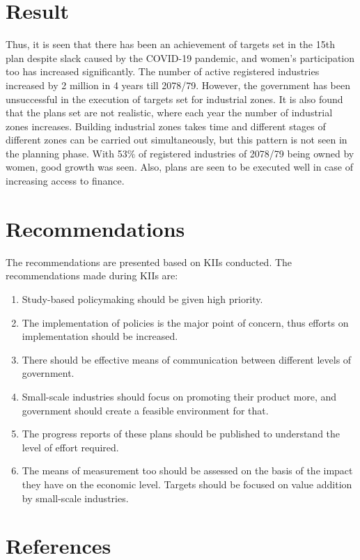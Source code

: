 \documentclass[a4paper]{article}
\begin{document}
\section{Result}
Thus, it is seen that there has been an achievement of targets set in the 15th plan despite slack caused by the COVID-19 pandemic, and women’s participation too has increased significantly. The number of active registered industries increased by 2 million in 4 years till 2078/79. However, the government has been unsuccessful in the execution of targets set for industrial zones. It is also found that the plans set are not realistic, where each year the number of industrial zones increases. Building industrial zones takes time and different stages of different zones can be carried out simultaneously, but this pattern is not seen in the planning phase. With 53\% of registered industries of 2078/79 being owned by women, good growth was seen. Also, plans are seen to be executed well in case of increasing access to finance. 
\section{Recommendations}
The recommendations are presented based on KIIs conducted. The recommendations made during KIIs are:
\begin{enumerate}
\setlength{\labelwidth}{3em}
\setlength{\itemsep}{0pt}
  \item Study-based policymaking should be given high priority.
  \item The implementation of policies is the major point of concern, thus efforts on implementation should be increased.
  \item There should be effective means of communication between different levels of government.
  \item Small-scale industries should focus on promoting their product more, and government should create a feasible environment for that.
  \item The progress reports of these plans should be published to understand the level of effort required.
  \item The means of measurement too should be assessed on the basis of the impact they have on the economic level. Targets should be focused on value addition by small-scale industries.
\end{enumerate}
 
\section*{References}
\end{document}
